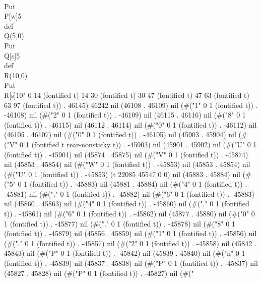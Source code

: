    \\Put\\P[w]{5}
   \\def\\Q{(5,0)}
   \\Put\\Q[s]{5}
   \\def\\R{(10,0)}
   \\Put\\R[s]{10}" 0 14 (fontified t) 14 30 (fontified t) 30 47 (fontified t) 47 63 (fontified t) 63 97 (fontified t)) . 46145) 46242 nil (46108 . 46109) nil (#("1" 0 1 (fontified t)) . -46108) nil (#("2" 0 1 (fontified t)) . -46109) nil (46115 . 46116) nil (#("8" 0 1 (fontified t)) . -46115) nil (46112 . 46114) nil (#("0" 0 1 (fontified t)) . -46112) nil (46105 . 46107) nil (#("0" 0 1 (fontified t)) . -46105) nil (45903 . 45904) nil (#("V" 0 1 (fontified t rear-nonsticky t)) . -45903) nil (45901 . 45902) nil (#("U" 0 1 (fontified t)) . -45901) nil (45874 . 45875) nil (#("V" 0 1 (fontified t)) . -45874) nil (45853 . 45854) nil (#("W" 0 1 (fontified t)) . -45853) nil (45853 . 45854) nil (#("U" 0 1 (fontified t)) . -45853) (t 22085 45547 0 0) nil (45883 . 45884) nil (#("5" 0 1 (fontified t)) . -45883) nil (45881 . 45884) nil (#("4" 0 1 (fontified t)) . -45881) nil (#("." 0 1 (fontified t)) . -45882) nil (#("6" 0 1 (fontified t)) . -45883) nil (45860 . 45863) nil (#("4" 0 1 (fontified t)) . -45860) nil (#("." 0 1 (fontified t)) . -45861) nil (#("6" 0 1 (fontified t)) . -45862) nil (45877 . 45880) nil (#("0" 0 1 (fontified t)) . -45877) nil (#("." 0 1 (fontified t)) . -45878) nil (#("8" 0 1 (fontified t)) . -45879) nil (45856 . 45859) nil (#("1" 0 1 (fontified t)) . -45856) nil (#("." 0 1 (fontified t)) . -45857) nil (#("2" 0 1 (fontified t)) . -45858) nil (45842 . 45843) nil (#("P" 0 1 (fontified t)) . -45842) nil (45839 . 45840) nil (#("n" 0 1 (fontified t)) . -45839) nil (45837 . 45838) nil (#("P" 0 1 (fontified t)) . -45837) nil (45827 . 45828) nil (#("P" 0 1 (fontified t)) . -45827) nil (#("
